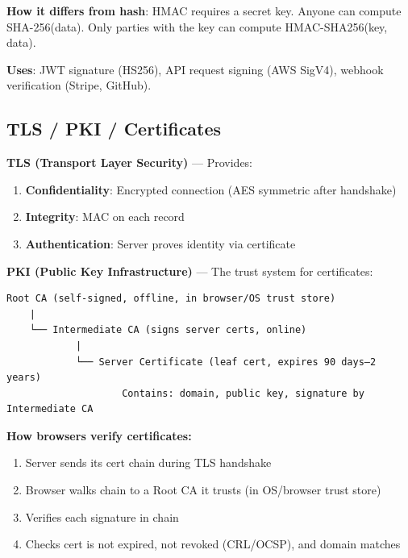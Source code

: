 \documentclass[11pt]{article}
\providecommand{\tightlist}{\setlength{\itemsep}{1pt}\setlength{\parskip}{0pt}}
\begin{document}
\textbf{How it differs from hash}: HMAC requires a secret key. Anyone can compute SHA-256(data). Only parties with the key can compute HMAC-SHA256(key, data).

\textbf{Uses}: JWT signature (HS256), API request signing (AWS SigV4), webhook verification (Stripe, GitHub).

\subsection{TLS / PKI / Certificates}\label{tls--pki--certificates}


\textbf{TLS (Transport Layer Security)} --- Provides:

\begin{enumerate}
\def\labelenumi{\arabic{enumi}.}
\tightlist
\item
  \textbf{Confidentiality}: Encrypted connection (AES symmetric after handshake)
\item
  \textbf{Integrity}: MAC on each record
\item
  \textbf{Authentication}: Server proves identity via certificate
\end{enumerate}

\textbf{PKI (Public Key Infrastructure)} --- The trust system for certificates:

\setcodelang{}

\begin{verbatim}
Root CA (self-signed, offline, in browser/OS trust store)
    |
    └── Intermediate CA (signs server certs, online)
            |
            └── Server Certificate (leaf cert, expires 90 days–2 years)
                    Contains: domain, public key, signature by Intermediate CA
\end{verbatim}

\textbf{How browsers verify certificates:}

\begin{enumerate}
\def\labelenumi{\arabic{enumi}.}
\tightlist
\item
  Server sends its cert chain during TLS handshake
\item
  Browser walks chain to a Root CA it trusts (in OS/browser trust store)
\item
  Verifies each signature in chain
\item
  Checks cert is not expired, not revoked (CRL/OCSP), and domain matches
\end{enumerate}
\end{document}
